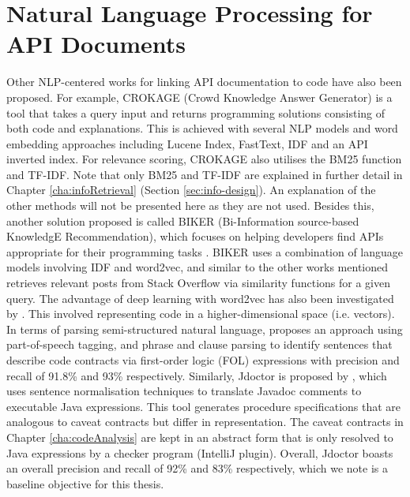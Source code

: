 \section{Natural Language Processing for API Documents}
\label{sec:related-nlp}
Other NLP-centered works for linking API documentation to code have also been proposed. For example, CROKAGE (Crowd Knowledge Answer Generator) is a tool that takes a query input and returns programming solutions consisting of both code and explanations. This is achieved with several NLP models and word embedding approaches including Lucene Index, FastText, IDF and an API inverted index. For relevance scoring, CROKAGE also utilises the BM25 function and TF-IDF. Note that only BM25 and TF-IDF are explained in further detail in Chapter \ref{cha:infoRetrieval} (Section \ref{sec:info-design}). An explanation of the other methods will not be presented here as they are not used. Besides this, another solution proposed is called BIKER (Bi-Information source-based KnowledgE Recommendation), which focuses on helping developers find APIs appropriate for their programming tasks \cite{huang2018api}. BIKER uses a combination of language models involving IDF and word2vec, and similar to the other works mentioned retrieves relevant posts from Stack Overflow via similarity functions for a given query. The advantage of deep learning with word2vec has also been investigated by \cite{van2017combining}. This involved representing code in a higher-dimensional space (i.e. vectors). \\
In terms of parsing semi-structured natural language, \cite{pandita2012inferring} proposes an approach using part-of-speech tagging, and phrase and clause parsing to identify sentences that describe code contracts via first-order logic (FOL) expressions with precision and recall of 91.8\% and 93\% respectively. Similarly, Jdoctor is proposed by \cite{blasi2018translating}, which uses sentence normalisation techniques to translate Javadoc comments to executable Java expressions. This tool generates procedure specifications that are analogous to caveat contracts but differ in representation.  The caveat contracts in Chapter \ref{cha:codeAnalysis} are kept in an abstract form that is only resolved to Java expressions by a checker program (IntelliJ plugin). Overall, Jdoctor boasts an overall precision and recall of 92\% and 83\% respectively, which we note is a baseline objective for this thesis.

